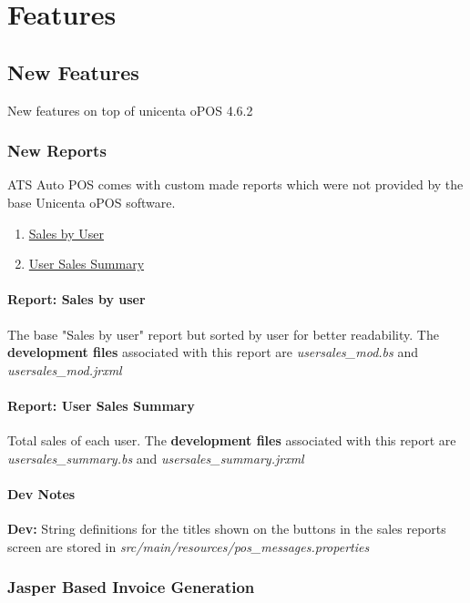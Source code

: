 \chapter{Features}

\section{New Features}

New features on top of unicenta oPOS 4.6.2

\subsection{New Reports}

ATS Auto POS comes with custom made reports which were not provided by the base Unicenta oPOS software.

\begin{enumerate}
	\item \hyperref[sec:salesbyuser]{Sales by User}
	\item \hyperref[sec:usersalessummary]{User Sales Summary}
\end{enumerate}
\subsubsection{Report: Sales by user}
\label{sec:salesbyuser}
The base "Sales by user" report but sorted by user for better readability. The \textbf{development files} associated with this report are \textit{usersales\_mod.bs} and \textit{usersales\_mod.jrxml}

\subsubsection{Report: User Sales Summary}
\label{sec:usersalessummary}
Total sales of each user. The \textbf{development files} associated with this report are \textit{usersales\_summary.bs} and \textit{usersales\_summary.jrxml}

\subsubsection{Dev Notes}

\textbf{Dev: } String definitions for the titles shown on the buttons in the sales reports screen are stored in \textit{src/main/resources/pos\_messages.properties}

\newpage

\subsection{Jasper Based Invoice Generation}

